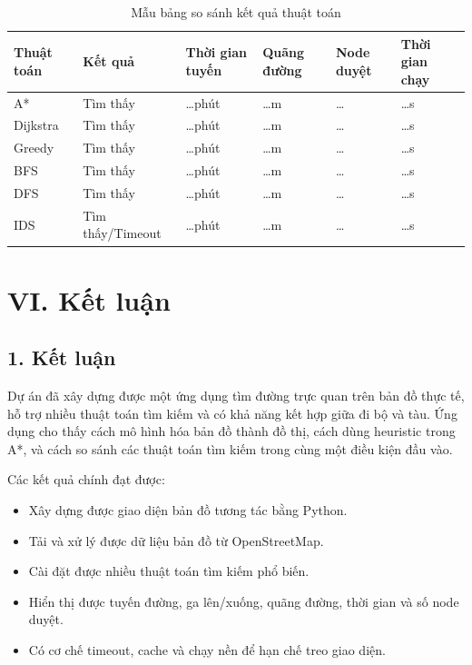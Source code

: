 \documentclass[12pt,a4paper]{article}
\begin{document}
\begin{table}[H]
\centering
\caption{Mẫu bảng so sánh kết quả thuật toán}
\renewcommand{\arraystretch}{1.25}
\begin{tabular}{|p{2.4cm}|p{2.1cm}|p{2.3cm}|p{2.4cm}|p{2.3cm}|p{2.3cm}|}
\hline
\textbf{Thuật toán} & \textbf{Kết quả} & \textbf{Thời gian tuyến} & \textbf{Quãng đường} & \textbf{Node duyệt} & \textbf{Thời gian chạy}\\
\hline
A* & Tìm thấy & \ldots phút & \ldots m & \ldots & \ldots s\\
\hline
Dijkstra & Tìm thấy & \ldots phút & \ldots m & \ldots & \ldots s\\
\hline
Greedy & Tìm thấy & \ldots phút & \ldots m & \ldots & \ldots s\\
\hline
BFS & Tìm thấy & \ldots phút & \ldots m & \ldots & \ldots s\\
\hline
DFS & Tìm thấy & \ldots phút & \ldots m & \ldots & \ldots s\\
\hline
IDS & Tìm thấy/Timeout & \ldots phút & \ldots m & \ldots & \ldots s\\
\hline
\end{tabular}
\end{table}

\section*{VI. Kết luận}

\subsection*{1. Kết luận}

Dự án đã xây dựng được một ứng dụng tìm đường trực quan trên bản đồ thực tế, hỗ trợ nhiều thuật toán tìm kiếm và có khả năng kết hợp giữa đi bộ và tàu. Ứng dụng cho thấy cách mô hình hóa bản đồ thành đồ thị, cách dùng heuristic trong A*, và cách so sánh các thuật toán tìm kiếm trong cùng một điều kiện đầu vào.

Các kết quả chính đạt được:
\begin{itemize}
    \item Xây dựng được giao diện bản đồ tương tác bằng Python.
    \item Tải và xử lý được dữ liệu bản đồ từ OpenStreetMap.
    \item Cài đặt được nhiều thuật toán tìm kiếm phổ biến.
    \item Hiển thị được tuyến đường, ga lên/xuống, quãng đường, thời gian và số node duyệt.
    \item Có cơ chế timeout, cache và chạy nền để hạn chế treo giao diện.
\end{itemize}
\end{document}
